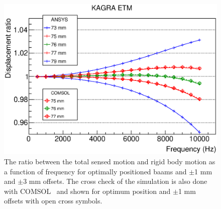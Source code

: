 
\begin{figure}
\begin{center}
\includegraphics[width=12cm]{Figures/fem-kge-opt.eps}
\caption{The ratio between the total sensed motion and rigid body motion 
as a function of frequency for optimally positioned baams and 
$\pm$1 mm and $\pm$3 mm offsets. The cross check of the simulation 
is also done with COMSOL~\cite{COMSOL} and shown for optimum position 
and $\pm$1 mm offsets with open cross symbols.} 
\label{fig:fem-opte} 
\end{center}
\end{figure}

